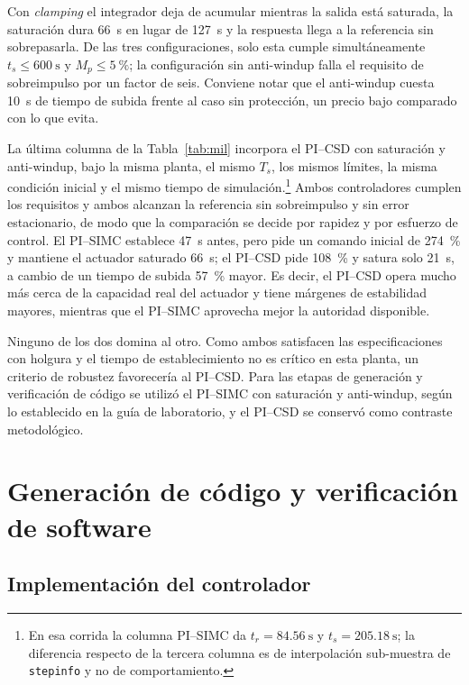 \documentclass[conference,a4paper,10pt]{IEEEtran}
\begin{document}
Con \emph{clamping} el integrador deja de acumular mientras la salida está saturada, la saturación
dura \SI{66}{\second} en lugar de \SI{127}{\second} y la respuesta llega a la referencia sin
sobrepasarla. De las tres configuraciones, solo esta cumple simultáneamente
$t_s \leq \SI{600}{\second}$ y $M_p \leq \SI{5}{\percent}$; la configuración sin anti-windup falla
el requisito de sobreimpulso por un factor de seis. Conviene notar que el anti-windup cuesta
\SI{10}{\second} de tiempo de subida frente al caso sin protección, un precio bajo comparado con lo
que evita.

La última columna de la Tabla~\ref{tab:mil} incorpora el PI--CSD con saturación y anti-windup, bajo
la misma planta, el mismo $T_s$, los mismos límites, la misma condición inicial y el mismo tiempo de
simulación.\footnote{En esa corrida la columna PI--SIMC da $t_r = \SI{84.56}{\second}$ y
$t_s = \SI{205.18}{\second}$; la diferencia respecto de la tercera columna es de interpolación
sub-muestra de \texttt{stepinfo} y no de comportamiento.} Ambos controladores cumplen los
requisitos y ambos alcanzan la referencia sin sobreimpulso y sin error estacionario, de modo que la
comparación se decide por rapidez y por esfuerzo de control. El PI--SIMC establece \SI{47}{\second}
antes, pero pide un comando inicial de \SI{274}{\percent} y mantiene el actuador saturado
\SI{66}{\second}; el PI--CSD pide \SI{108}{\percent} y satura solo \SI{21}{\second}, a cambio de un
tiempo de subida \SI{57}{\percent} mayor. Es decir, el PI--CSD opera mucho más cerca de la
capacidad real del actuador y tiene márgenes de estabilidad mayores, mientras que el PI--SIMC
aprovecha mejor la autoridad disponible.

Ninguno de los dos domina al otro. Como ambos satisfacen las especificaciones con holgura y el
tiempo de establecimiento no es crítico en esta planta, un criterio de robustez favorecería al
PI--CSD. Para las etapas de generación y verificación de código se utilizó el PI--SIMC con
saturación y anti-windup, según lo establecido en la guía de laboratorio, y el PI--CSD se conservó
como contraste metodológico.

\section{Generación de código y verificación de software}

\subsection{Implementación del controlador}
\end{document}
